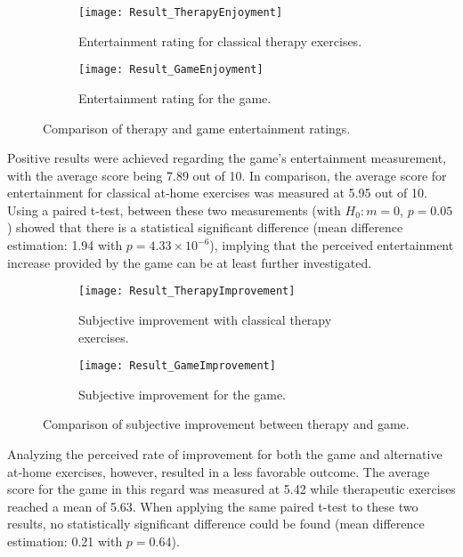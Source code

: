 \documentclass[draft,final]{vutinfth} %
\begin{document}
\begin{figure}
\begin{subfigure}{.9\textwidth}
  \centering
  \texttt{[image: Result\_TherapyEnjoyment]}
  \caption{Entertainment rating for classical therapy exercises.}
\end{subfigure}
\begin{subfigure}{.9\textwidth}
  \centering
  \texttt{[image: Result\_GameEnjoyment]}
  \caption{Entertainment rating for the game.}
\end{subfigure}
\caption{Comparison of therapy and game entertainment ratings.}
\end{figure}

Positive results were achieved regarding the game's entertainment measurement, with the average score being 7.89 out of 10. In comparison, the average score for entertainment for classical at-home exercises was measured at 5.95 out of 10.  Using a paired t-test, between these two measurements (with $H_0: m=0$, $p=0.05$) showed that there is a statistical significant difference (mean difference estimation: 1.94 with $p=4.33 \times 10^{-6}$), implying that the perceived entertainment increase provided by the game can be at least further investigated.\\

\begin{figure}
\begin{subfigure}{.9\textwidth}
  \centering
  \texttt{[image: Result\_TherapyImprovement]}
  \caption{Subjective improvement with classical therapy exercises.}
\end{subfigure}
\begin{subfigure}{.9\textwidth}
  \centering
  \texttt{[image: Result\_GameImprovement]}
  \caption{Subjective improvement for the game.}
\end{subfigure}
\caption{Comparison of subjective improvement between therapy and game.}
\end{figure}

Analyzing the perceived rate of improvement for both the game and alternative at-home exercises, however, resulted in a less favorable outcome. The average score for the game in this regard was measured at 5.42 while therapeutic exercises reached a mean of 5.63. When applying the same paired t-test to these two results, no statistically significant difference could be found (mean difference estimation: 0.21 with $p=0.64$).
\end{document}
